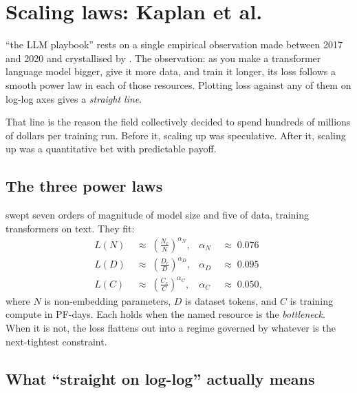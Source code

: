 \section{Scaling laws: Kaplan et al.}
\label{ch:kaplan}

 ``the LLM playbook'' rests on a single
empirical observation made between 2017 and 2020 and crystallised by
\citet{kaplan2020scaling}. The observation: as you make a transformer
language model bigger, give it more data, and train it longer, its loss
follows a smooth power law in each of those resources. Plotting loss against
any of them on log-log axes gives a \emph{straight line}.

That line is the reason the field collectively decided to spend hundreds of
millions of dollars per training run. Before it, scaling up was speculative.
After it, scaling up was a quantitative bet with predictable payoff.

\subsection{The three power laws}

\citet{kaplan2020scaling} swept seven orders of magnitude of model size and
five of data, training transformers on text. They fit:
\begin{align}
  L(N) &\;\approx\; \left(\frac{N_c}{N}\right)^{\alpha_N},
  & \alpha_N &\;\approx\; 0.076 \\
  L(D) &\;\approx\; \left(\frac{D_c}{D}\right)^{\alpha_D},
  & \alpha_D &\;\approx\; 0.095 \\
  L(C) &\;\approx\; \left(\frac{C_c}{C}\right)^{\alpha_C},
  & \alpha_C &\;\approx\; 0.050,
\end{align}
where \(N\) is non-embedding parameters, \(D\) is dataset tokens, and \(C\)
is training compute in PF-days. Each holds when the named
resource is the \emph{bottleneck}. When it is not, the loss flattens out
into a regime governed by whatever is the next-tightest constraint.

\subsection{What ``straight on log-log'' actually means}

